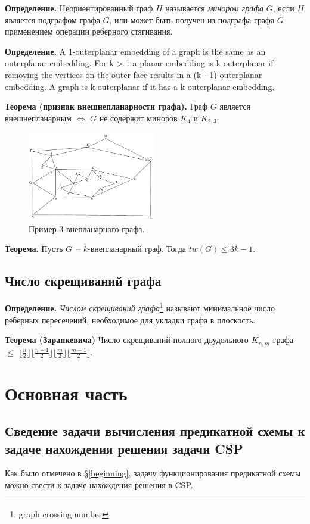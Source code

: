 \documentclass[12pt]{article}
\begin{document}
\textbf{Определение.}
Hеориентированный граф $H$ называется \textit{минором графа} $G$, если $H$
является подграфом графа $G$, или может быть получен из подграфа графа $G$ применением операции реберного стягивания.

\textbf{Определение.}
A 1-outerplanar embedding of a graph is the same as an outerplanar embedding. 
For k > 1 a planar embedding is k-outerplanar if removing the vertices on the outer
face results in a (k - 1)-outerplanar embedding. A graph is k-outerplanar if it has a 
k-outerplanar embedding.

\textbf{Теорема (признак внешнепланарности графа).}
Граф $G$ является внешнепланарным $\iff$ $G$ не содержит миноров $K_4$ и $K_{2,3}$\cite{Diestel00}.

\begin{figure}[htb]
\centering
\includegraphics[width=0.50\textwidth]{outerplanar.png}
\caption{Пример 3-внепланарного графа.}
\label{fig:outerplanar_graph}
\end{figure}

\textbf{Теорема.}
Пусть $G$~-- $k$-внепланарный граф. Тогда $tw(G) \leq 3k-1.$\cite{Boedlander96}

\subsection{Число скрещиваний графа}

\textbf{Определение.} \textit{Числом скрещиваний графа}\footnote{graph crossing number} называют 
минимальное число реберных пересечений, необходимое для укладки графа в плоскость.

\textbf{Теорема (Заранкевича)} Число скрещиваний полного двудольного $K_{n,m}$ графа $\leq$
$\lfloor \frac{n}{2} \rfloor \lfloor \frac{n-1}{2} \rfloor \lfloor \frac{m}{2} \rfloor \lfloor \frac{m-1}{2} \rfloor$.
\cite{Zarank54}
\section{Основная часть}
\subsection{Сведение задачи вычисления предикатной схемы к задаче нахождения решения задачи CSP}
Как было отмечено в \S \ref{beginning}, задачу функционирования предикатной схемы можно свести к задаче нахождения решения в CSP. 
\end{document}
